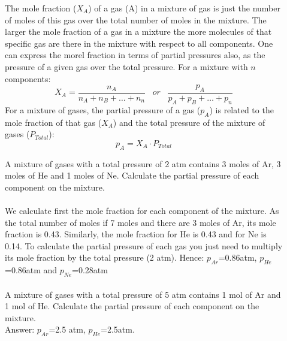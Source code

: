 \documentclass[main.tex]{subfiles}
\begin{document}
\begin{description}
\item[] The mole fraction ($X_A$) of a gas (A) in a mixture of gas is just the number of moles of this gas over the total number of moles in the mixture. The larger the mole fraction of a gas in a mixture the more molecules of that specific gas are there in the mixture with respect to all components. One can express the morel fraction in terms of partial pressures also, as the pressure of a given gas over the total pressure. For a mixture with $n$ components:
\begin{equation*}
\boxed{  X_A = \frac{n_A}{n_A + n_B + \dots + n_n}\;\; \;    or\;\; \;   \frac{p_A}{p_A + p_B + \dots + p_n} }
\end{equation*}
For a mixture of gases, the partial pressure of a gas ($p_A$) is related to the mole fraction of that gas ($X_A$) and the total pressure of the mixture of gases ($P_{Total}$):
\begin{equation*}
\boxed{  p_A=X_A\cdot P_{Total}}
\end{equation*}
\begin{example} %
A mixture of gases with a total pressure of 2 atm contains 3 moles of Ar, 3 moles of He and 1 moles of Ne. Calculate the partial pressure of each component on the mixture. 
\\
\\
We calculate first the mole fraction for each component of the mixture. As the total number of moles if 7 moles and there are 3 moles of Ar, its mole fraction is 0.43. Similarly, the mole fraction for He is 0.43 and for Ne is 0.14. To calculate the partial pressure of each gas you just need to multiply its mole fraction by the total pressure (2 atm). Hence: $p_{Ar}$=0.86atm, $p_{He}$=0.86atm and $p_{Ne}$=0.28atm
\\
\faDiamond\ \\
A mixture of gases with a total pressure of 5 atm contains 1 mol of Ar and 1 mol of He. Calculate the partial pressure of each component on the mixture. 
\\
\flushright Answer: $p_{Ar}$=2.5 atm, $p_{He}$=2.5atm.
\end{example}%



\end{description}
\end{document}
